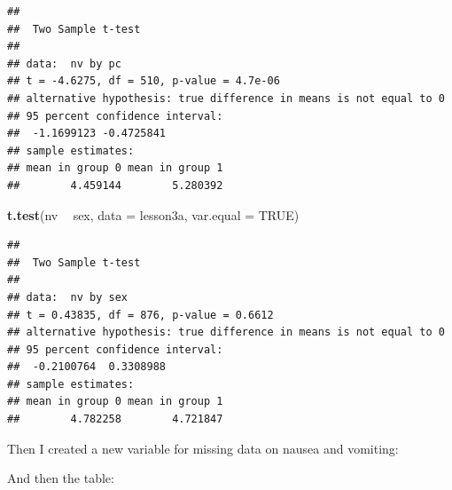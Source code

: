 \documentclass[]{book}
\newenvironment{Shaded}{\begin{snugshade}}{\end{snugshade}}
\newcommand{\DataTypeTok}[1]{\textcolor[rgb]{0.13,0.29,0.53}{#1}}
\newcommand{\DecValTok}[1]{\textcolor[rgb]{0.00,0.00,0.81}{#1}}
\newcommand{\KeywordTok}[1]{\textcolor[rgb]{0.13,0.29,0.53}{\textbf{#1}}}
\newcommand{\NormalTok}[1]{#1}
\newcommand{\OperatorTok}[1]{\textcolor[rgb]{0.81,0.36,0.00}{\textbf{#1}}}
\newcommand{\OtherTok}[1]{\textcolor[rgb]{0.56,0.35,0.01}{#1}}
\newcommand{\StringTok}[1]{\textcolor[rgb]{0.31,0.60,0.02}{#1}}
\begin{document}
\begin{verbatim}
## 
##  Two Sample t-test
## 
## data:  nv by pc
## t = -4.6275, df = 510, p-value = 4.7e-06
## alternative hypothesis: true difference in means is not equal to 0
## 95 percent confidence interval:
##  -1.1699123 -0.4725841
## sample estimates:
## mean in group 0 mean in group 1 
##        4.459144        5.280392
\end{verbatim}

\begin{Shaded}
\begin{Highlighting}[]
\KeywordTok{t.test}\NormalTok{(nv }\OperatorTok{~}\StringTok{ }\NormalTok{sex, }\DataTypeTok{data =}\NormalTok{ lesson3a, }\DataTypeTok{var.equal =} \OtherTok{TRUE}\NormalTok{)}
\end{Highlighting}
\end{Shaded}

\begin{verbatim}
## 
##  Two Sample t-test
## 
## data:  nv by sex
## t = 0.43835, df = 876, p-value = 0.6612
## alternative hypothesis: true difference in means is not equal to 0
## 95 percent confidence interval:
##  -0.2100764  0.3308988
## sample estimates:
## mean in group 0 mean in group 1 
##        4.782258        4.721847
\end{verbatim}

Then I created a new variable for missing data on nausea and vomiting:

\begin{Shaded}
\end{Shaded}

And then the table:

\begin{Shaded}
\end{Shaded}
\end{document}
